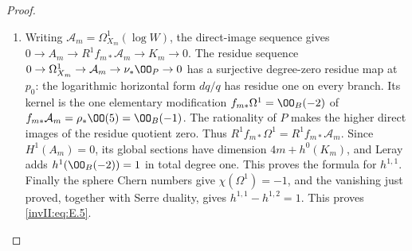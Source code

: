 \begin{proof}
\begin{enumerate}[label={$\langle1\rangle$\arabic*.},leftmargin=*]
\item Writing $\mathcal A_m=\Omega^1_{X_m}(\log W)$, the direct-image
sequence gives
$0\to A_m\to R^1f_{m*}\mathcal A_m\to K_m\to0$.
The residue sequence
$0\to\Omega^1_{X_m}\to\mathcal A_m\to\nu_*\OO_P\to0$
has a surjective degree-zero residue map at $p_0$: the logarithmic
horizontal form $dq/q$ has residue one on every branch. Its kernel
is the one elementary modification
$f_{m*}\Omega^1=\OO_B(-2)$ of
$f_{m*}\mathcal A_m=\rho_*\OO(5)=\OO_B(-1)$.
The rationality of $P$ makes the higher direct images of the
residue quotient zero. Thus
$R^1f_{m*}\Omega^1=R^1f_{m*}\mathcal A_m$.
Since $H^1(A_m)=0$, its global sections have dimension
$4m+h^0(K_m)$, and Leray adds
$h^1(\OO_B(-2))=1$ in total degree one. This proves the formula
for $h^{1,1}$. Finally the sphere Chern numbers give
$\chi(\Omega^1)=-1$, and the vanishing just proved, together with
Serre duality, gives $h^{1,1}-h^{1,2}=1$. This proves \eqref{invII:eq:E.5}.

\end{enumerate}
\end{proof}
